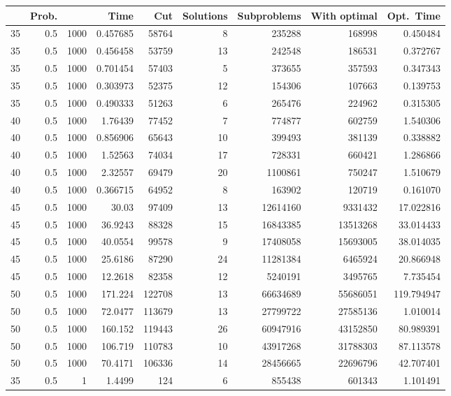 \documentclass[a4paper,11pt]{article}
\begin{document}
\begin{table}
\begin{center}
\begin{tabular}{|rrr|r|r|rrr|r|}
\hline
 & Prob. &  & Time & Cut & Solutions & Subproblems & With
optimal & Opt.\ Time \\
\hline
35 & 0.5 & 1000 & 0.457685 & 58764 & 8 & 235288 & 168998 & 0.450484 \\
35 & 0.5 & 1000 & 0.456458 & 53759 & 13 & 242548 & 186531 & 0.372767 \\
35 & 0.5 & 1000 & 0.701454 & 57403 & 5 & 373655 & 357593 & 0.347343 \\
35 & 0.5 & 1000 & 0.303973 & 52375 & 12 & 154306 & 107663 & 0.139753 \\
35 & 0.5 & 1000 & 0.490333 & 51263 & 6 & 265476 & 224962 & 0.315305 \\
40 & 0.5 & 1000 & 1.76439 & 77452 & 7 & 774877 & 602759 & 1.540306 \\
40 & 0.5 & 1000 & 0.856906 & 65643 & 10 & 399493 & 381139 & 0.338882 \\
40 & 0.5 & 1000 & 1.52563 & 74034 & 17 & 728331 & 660421 & 1.286866 \\
40 & 0.5 & 1000 & 2.32557 & 69479 & 20 & 1100861 & 750247 & 1.510679 \\
40 & 0.5 & 1000 & 0.366715 & 64952 & 8 & 163902 & 120719 & 0.161070 \\
45 & 0.5 & 1000 & 30.03 & 97409 & 13 & 12614160 & 9331432 & 17.022816 \\
45 & 0.5 & 1000 & 36.9243 & 88328 & 15 & 16843385 & 13513268 & 33.014433 \\
45 & 0.5 & 1000 & 40.0554 & 99578 & 9 & 17408058 & 15693005 & 38.014035 \\
45 & 0.5 & 1000 & 25.6186 & 87290 & 24 & 11281384 & 6465924 & 20.866948 \\
45 & 0.5 & 1000 & 12.2618 & 82358 & 12 & 5240191 & 3495765 & 7.735454 \\
50 & 0.5 & 1000 & 171.224 & 122708 & 13 & 66634689 & 55686051 & 119.794947 \\
50 & 0.5 & 1000 & 72.0477 & 113679 & 13 & 27799722 & 27585136 & 1.010014 \\
50 & 0.5 & 1000 & 160.152 & 119443 & 26 & 60947916 & 43152850 & 80.989391 \\
50 & 0.5 & 1000 & 106.719 & 110783 & 10 & 43917268 & 31788303 & 87.113578 \\
50 & 0.5 & 1000 & 70.4171 & 106336 & 14 & 28456665 & 22696796 & 42.707401 \\
\hline
35 & 0.5 & 1 & 1.4499 & 124 & 6 & 855438 & 601343 & 1.101491 \\

\end{tabular}
\end{center}
\end{table}
\end{document}
